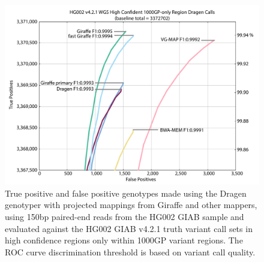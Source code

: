 \documentclass[11pt]{ucscthesis}
\begin{document}
\begin{figure}[H]
    \centering
    \includegraphics[width=\linewidth]{HG002_v4.2.1_high_conf.35x_150bp.wgs.vcfevalroc.1000GP_only.pdf}
    \caption[Genotyping evaluation for the Dragen genotyper with projected mappings from Giraffe and other mappers in 1000GP regions only]{True positive and false positive genotypes made using the Dragen genotyper with projected mappings from Giraffe and other mappers, using 150bp paired-end reads from the HG002 GIAB sample and evaluated against the HG002 GIAB v4.2.1 truth variant call sets in high confidence regions only within 1000GP variant regions. The ROC curve discrimination threshold is based on variant call quality.}
    \label{fig:150bp_genotyping_1000GP_only}
\end{figure}
\end{document}
